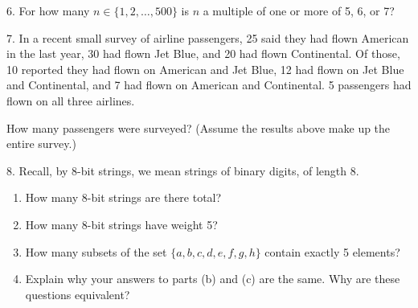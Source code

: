 \documentclass[10pt,]{book}
\theoremstyle{plain}
\theoremstyle{definition}
\theoremstyle{definition}
\theoremstyle{definition}
\numberwithin{equation}{chapter}
\begin{document}
\begin{exerciselist}
\par\smallskip
\item[6.]\hypertarget{exercise-107}{}
            For how many \(n \in \{1,2, \ldots, 500\}\) is \(n\) a multiple of one or more of 5, 6, or 7?
\par\smallskip
\item[7.]\hypertarget{exercise-108}{}
            In a recent small survey of airline passengers, 25 said they had flown American in the last year, 30 had flown Jet Blue, and 20 had flown Continental. Of those, 10 reported they had flown on American and Jet Blue, 12 had flown on Jet Blue and Continental, and 7 had flown on American and Continental. 5 passengers had flown on all three airlines.
\par

            How many passengers were surveyed? (Assume the results above make up the entire survey.)
\par\smallskip
\item[8.]\hypertarget{exercise-109}{}
            Recall, by \(8\)-bit strings, we mean strings of binary digits, of length 8.
            \leavevmode%
\begin{enumerate}[label=(\alph*)]
\item\hypertarget{li-733}{}
                How many \(8\)-bit strings are there total?
\item\hypertarget{li-734}{}
                How many \(8\)-bit strings have weight 5?
\item\hypertarget{li-735}{}
                How many subsets of the set \(\{a,b,c,d,e,f,g,h\}\) contain exactly 5 elements?
\item\hypertarget{li-736}{}
                Explain why your answers to parts (b) and (c) are the same. Why are these questions equivalent?
\end{enumerate}


\end{exerciselist}
\end{document}
